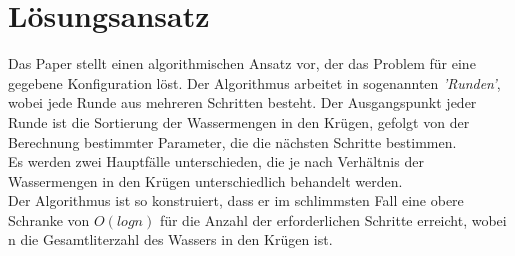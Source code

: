 \chapter{Lösungsansatz} 
Das Paper stellt einen algorithmischen Ansatz vor, der das Problem für eine gegebene Konfiguration löst. Der Algorithmus arbeitet in sogenannten \emph{'Runden'}, wobei jede Runde aus mehreren Schritten besteht. Der Ausgangspunkt jeder Runde ist die Sortierung der Wassermengen in den Krügen, gefolgt von der Berechnung bestimmter Parameter, die die nächsten Schritte bestimmen. \\
Es werden zwei Hauptfälle unterschieden, die je nach Verhältnis der Wassermengen in den Krügen unterschiedlich behandelt werden. \\ 
Der Algorithmus ist so konstruiert, dass er im schlimmsten Fall eine obere Schranke von $O(log n)$ für die Anzahl der erforderlichen Schritte erreicht, wobei n die Gesamtliterzahl des Wassers in den Krügen ist.  %




